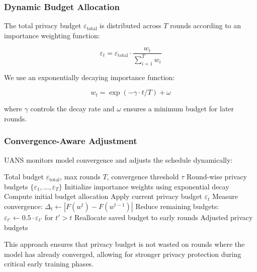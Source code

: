 \documentclass{ieeeaccess}
\theoremstyle{definition}
\begin{document}
\subsubsection{Dynamic Budget Allocation}

The total privacy budget $\varepsilon_{\text{total}}$ is distributed across $T$ rounds according to an importance weighting function:

\begin{equation}
\varepsilon_t = \varepsilon_{\text{total}} \cdot \frac{w_t}{\sum_{i=1}^{T} w_i}
\end{equation}

We use an exponentially decaying importance function:

\begin{equation}
w_t = \exp(-\gamma \cdot t / T) + \omega
\end{equation}

where $\gamma$ controls the decay rate and $\omega$ ensures a minimum budget for later rounds.

\subsubsection{Convergence-Aware Adjustment}

UANS monitors model convergence and adjusts the schedule dynamically:

\begin{algorithm}
\caption{Utility-Aware Noise Scheduling}
\label{alg:uans}
\begin{algorithmic}[1]
\REQUIRE Total budget $\varepsilon_{\text{total}}$, max rounds $T$, convergence threshold $\tau$
\ENSURE Round-wise privacy budgets $\{\varepsilon_1, ..., \varepsilon_T\}$
\STATE Initialize importance weights using exponential decay
\STATE Compute initial budget allocation
    \STATE Apply current privacy budget $\varepsilon_t$
    \STATE Measure convergence: $\Delta_t \leftarrow |F(w^t) - F(w^{t-1})|$
        \STATE Reduce remaining budgets: $\varepsilon_{t'} \leftarrow 0.5 \cdot \varepsilon_{t'}$ for $t' > t$
        \STATE Reallocate saved budget to early rounds
    \ENDIF
\ENDFOR
\RETURN Adjusted privacy budgets
\end{algorithmic}
\end{algorithm}

This approach ensures that privacy budget is not wasted on rounds where the model has already converged, allowing for stronger privacy protection during critical early training phases.
\end{document}
